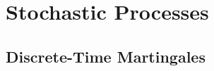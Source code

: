 \documentclass[openany]{book}
\newtheorem{theorem}{Theorem}[chapter]
\theoremstyle{definition}
\theoremstyle{remark}
\begin{document}
\begin{comment}
\section{Poisson Convergence}
\begin{theorem}[Law of Small Numbers]
    For $i\ge1$, let $X_{i1},\ldots,X_{ii}$ be independent, non-negative-integer-valued r.v.'s such that
    \begin{itemize}
        \item $\sum_{j=1}^{i}P(X_{ij}=1)\to\lambda\in(0,+\infty)$;
        \item $\sum_{j=1}^{i}P(X_{ij}\ge2)\to0$;
        \item $\max_{1\le j\le i}P(X_{ij}=1)\to0$.
    \end{itemize}
    Then $\sum_{j=1}^{i}X_{ij}$ converges to $\mathrm{Poi}(\lambda)$ in the total variation distance, and thus in distribution.
\end{theorem}
\begin{proof}
    Here are the key proof ideas:
    \begin{itemize}
        \item Suppose $X_i\sim \mathrm{Poi}(\lambda_i)$, then $\sum_{i}^{}X_i\sim \mathrm{Poi}\left(\sum_{i}^{}\lambda_i\right)$.
        \item Suppose $X\sim \mathrm{Ber}(p)$, $Y\sim \mathrm{Poi}(p)$, then $d_{\mathrm{TV}}(X,Y)=p\left(1-e^{-p}\right)\le p^2$.
        \item Suppose $X_1$, $X_2$, $Y_1$, and $Y_2$ are non-negative-integer-valued r.v.'s, $X_1$ and $X_2$, $Y_1$ and $Y_2$ are independent. Then $d_{\mathrm{TV}}(X_1+X_2,Y_1+Y_2)\le d_{\mathrm{TV}}(X_1,Y_1)+d_{\mathrm{TV}}(X_2,Y_2)$.
    \end{itemize}
\end{proof}
\end{comment}

\part{Stochastic Processes}
\chapter{Discrete-Time Martingales}
\end{document}
